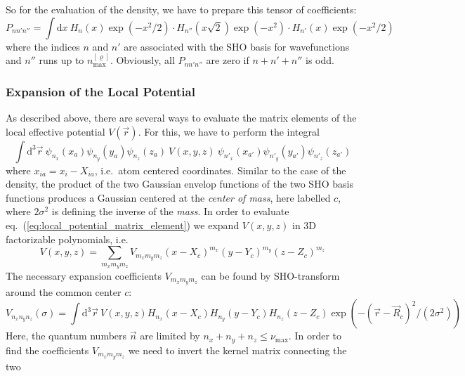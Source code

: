 \documentclass[oribibl]{llncs}
\newcommand{\um}[1]{_{\mathrm{#1}}}
\newcommand{\numax}{\nu\um{max}}
\begin{document}
So for the evaluation of the density,
we have to prepare this tensor of coefficients:
\begin{equation}
	P_{nn'n''} = \int \mathrm d x \ H_{n}(x) \exp(-x^2/2) \cdot H_{n''}(x\sqrt{2}) \exp(-x^2) \cdot H_{n'}(x) \exp(-x^2/2)
\end{equation}
where the indices $n$ and $n'$ are associated with the \ac{SHO} basis for wavefunctions
and $n''$ runs up to $n\um{max}^{[\varrho]}$. 
Obviously, all $P_{nn'n''}$ are zero if $n + n' + n''$ is odd.

\subsubsection{Expansion of the Local Potential}
As described above, there are several ways to evaluate the matrix elements of the local effective potential $V(\vec r)$.
For this, we have to perform the integral
\begin{equation}
	\int \mathrm d^3 \vec r  \  \psi_{n_x}(x_a)\psi_{n_y}(y_a)\psi_{n_z}(z_a)  \  V(x,y,z) \ 
	                            \psi_{n'_x}(x_{a'})\psi_{n'_y}(y_{a'})\psi_{n'_z}(z_{a'})
	                            \label{eq:local_potential_matrix_element}
\end{equation}
where $x_{ia} = x_{i} - X_{ia}$, i.e.~atom centered coordinates.
Similar to the case of the density, the product of the two Gaussian envelop functions of the 
two \ac{SHO} basis functions produces a Gaussian centered at the \emph{center of mass}, here labelled $c$, where
$2\sigma^2$ is defining the inverse of the \emph{mass}.
In order to evaluate eq.~(\ref{eq:local_potential_matrix_element}) we
expand $V(x,y,z)$ in 3D factorizable polynomials, i.e.
\begin{equation}
	V(x,y,z) = \sum_{m_x m_y m_z} V_{m_x m_y m_z} (x - X_c)^{m_x} (y - Y_c)^{m_y} (z - Z_c)^{m_z}
	                            \label{eq:local_potential_polynomial_expansion}
\end{equation}
The necessary expansion coefficients $V_{m_x m_y m_z}$ can be found by \ac{SHO}-transform around the common center $c$:
\begin{equation}
	V_{n_x n_y n_z}(\sigma) = \int \mathrm d^3 \vec r  \   V(x,y,z) H_{n_x}(x - X_c) H_{n_y}(y - Y_c) H_{n_z}(z - Z_c) 
		\exp(-(\vec r - \vec R_c)^2/(2 \sigma^2))
	                            \label{eq:local_potential_projection}
\end{equation}
Here, the quantum numbers $\vec n$ are limited by $n_x + n_y + n_z \leq \numax$.
In order to find the coefficients $V_{m_x m_y m_z}$ we need to invert the kernel matrix connecting the two
\end{document}
